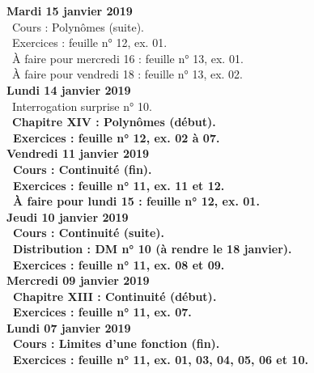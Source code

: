 \documentclass[12pt,a4paper]{article}
\begin{document}
\noindent\textbf{Mardi 15 janvier 2019} \\
\bu\ Cours : Polynômes (suite).\\
\bu\ Exercices : feuille n° 12, ex. 01.\\
\bu\ À faire pour mercredi 16 : feuille n° 13, ex. 01.\\
\bu\ À faire pour vendredi 18 : feuille n° 13, ex. 02.\vspace{.4cm}\\
 
\noindent\textbf{Lundi 14 janvier 2019} \\
\bu\ Interrogation surprise n° 10.\\
\bu\ \bf Chapitre XIV \rm : Polynômes (début).\\
\bu\ Exercices : feuille n° 12, ex. 02 à 07.\vspace{.4cm}\\

\noindent\textbf{Vendredi 11 janvier 2019}\\
\bu\ Cours : Continuité (fin).\\
\bu\ Exercices : feuille n° 11, ex. 11 et 12.\\
\bu\ À faire pour lundi 15 : feuille n° 12, ex. 01.\vspace{.4cm}\\
 
\noindent\textbf{Jeudi 10 janvier 2019}\\
\bu\ Cours : Continuité (suite).\\
\bu\ Distribution : DM n° 10 (à rendre le 18 janvier).\\
\bu\ Exercices : feuille n° 11, ex. 08 et 09.\vspace{.4cm}\\
 
\noindent\textbf{Mercredi 09 janvier 2019} \\
\bu\ \bf Chapitre XIII \rm : Continuité (début).\\
\bu\ Exercices : feuille n° 11, ex. 07.\vspace{.4cm}\\
 
\noindent\textbf{Lundi 07 janvier 2019} \\
\bu\ Cours : Limites d'une fonction (fin).\\
\bu\ Exercices : feuille n° 11, ex. 01, 03, 04, 05, 06 et 10.\vspace{.4cm}\\
\end{document}
